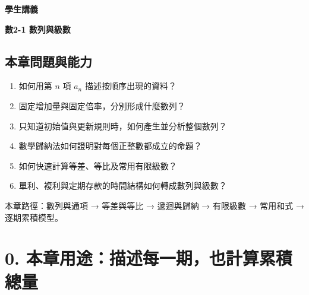 \documentclass[11pt,a4paper]{article}
\providecommand{\tightlist}{%
  \setlength{\itemsep}{0pt}\setlength{\parskip}{0pt}}
\begin{document}
\begin{tcolorbox}[
  enhanced,colback=white,colframe=HandoutBlue,boxrule=1.1pt,arc=2mm,
  borderline west={3pt}{0pt}{HandoutBlue},left=5mm,right=4mm,top=4mm,bottom=4mm
]
{\sffamily\small\bfseries\color{HandoutBlue}學生講義}\par
{\sffamily\bfseries\LARGE\color{HandoutInk}數2-1 數列與級數}\par
\vspace{0.35em}{\large 用索引、遞迴與部分和描述逐期變化及累積結果}\par
{}\par
{}\par
\end{tcolorbox}


\begin{HandoutLearningMap}

\subsection{本章問題與能力}\label{ux672cux7ae0ux554fux984cux8207ux80fdux529b}

\begin{enumerate}
\def\labelenumi{\arabic{enumi}.}
\tightlist
\item
  如何用第 \(n\) 項 \(a_n\) 描述按順序出現的資料？
\item
  固定增加量與固定倍率，分別形成什麼數列？
\item
  只知道初始值與更新規則時，如何產生並分析整個數列？
\item
  數學歸納法如何證明對每個正整數都成立的命題？
\item
  如何快速計算等差、等比及常用有限級數？
\item
  單利、複利與定期存款的時間結構如何轉成數列與級數？
\end{enumerate}

本章路徑：數列與通項 → 等差與等比 → 遞迴與歸納 → 有限級數 → 常用和式 → 逐期累積模型。

\end{HandoutLearningMap}

\section{0. 本章用途：描述每一期，也計算累積總量}\label{ux672cux7ae0ux7528ux9014ux63cfux8ff0ux6bcfux4e00ux671fux4e5fux8a08ux7b97ux7d2fux7a4dux7e3dux91cf}
\end{document}
